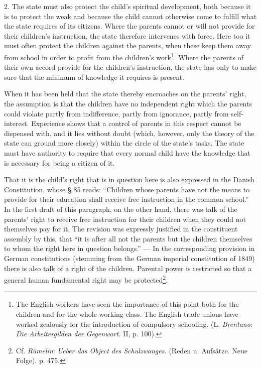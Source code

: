 \documentclass[12pt,a4paper,openany]{book}
\newcommand{\opage}[1]{\marginnote{\footnotesize\textit{[#1]}}}
\begin{document}
2. The state must also protect the child's spiritual development, both because it is to protect the weak and because
the child cannot otherwise come to fulfill what the state requires of its citizens. Where the parents cannot or will not
provide for their children's instruction, the state therefore intervenes with force. Here too it must often protect the
children against the
\opage{340}parents, when these keep them away from school in order to profit from the children's
work\footnote[1]{The English workers have seen the importance of this point both for the children and for the whole
working class. The English trade unions have worked zealously for the introduction of compulsory schooling. (L.
\emph{Brentano}: \textit{Die Arbeitergilden der Gegenwart.} II, p. 100).}. Where the parents of their own accord
provide for the children's instruction, the state has only to make sure that the minimum of knowledge it requires is
present.

When it has been held that the state thereby encroaches on the parents' right, the assumption is that the children have
no independent right which the parents could violate partly from indifference, partly from ignorance, partly from
self-interest. Experience shows that a control of parents in this respect cannot be dispensed with, and it lies without
doubt (which, however, only the theory of the state can ground more closely) within the circle of the state's tasks. The
state must have authority to require that every normal child have the knowledge that is necessary for being a citizen
of it.

That it is the child's right that is in question here is also expressed in the Danish Constitution, whose § 85 reads:
``Children whose parents have not the means to provide for their education shall receive free instruction in the common
school.'' In the first draft of this paragraph, on the other hand, there was talk of the parents' right to receive free
instruction for their children when they could not themselves pay for it. The revision was expressly justified in the
constituent assembly by this, that ``it is after all not the parents but the children themselves to whom the right here
in question belongs.'' --- In the corresponding provision in German constitutions (stemming from the German imperial
constitution of 1849) there is also talk of a right of the children. Parental power is restricted so that a general
human fundamental right may be protected\footnote[2]{Cf. \emph{Rümelin}: \textit{Ueber das Object des Schulzwanges.}
(Reden u. Aufsätze. Neue Folge). p. 475.}.
\end{document}
